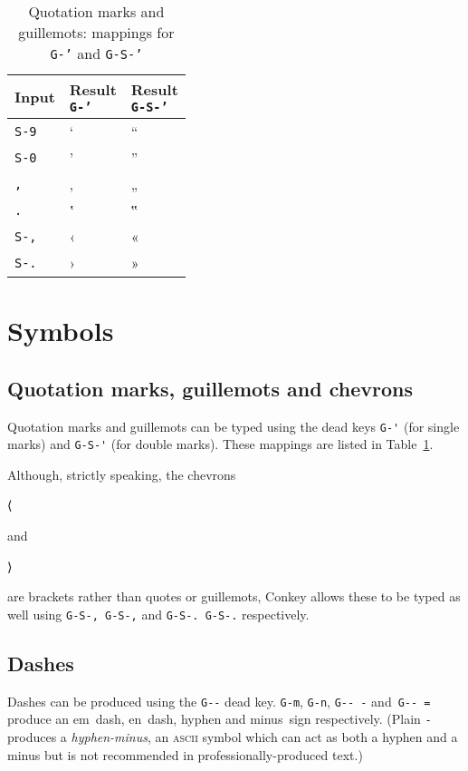 \documentclass[oneside]{memoir}
\newcommand{\key}{\verb}
\newcommand{\keynv}{\texttt}
\newcommand{\out}[1]{\colorbox{gray!20}{\strut{}#1}}
\begin{document}
\begin{table}[t]
\caption{Quotation marks and guillemots: mappings for \keynv{G-'} and \keynv{G-S-'}}
\label{tab:quotes_guillemots}
\centering
\begin{tabular}{lll}
\toprule
Input & \makecell{Result\\\keynv{G-'}} & \makecell{Result\\\keynv{G-S-'}} \\
\midrule
\key|S-9| & ‘ & “ \\
\key|S-0| & ’ & ” \\
\key|,|   & ‚ & „ \\
\key|.|   & ‛ & ‟ \\
\key|S-,| & ‹ & « \\
\key|S-.| & › & » \\
\bottomrule
\end{tabular}
\end{table}

\section{Symbols}
\label{sec:symbols}

\subsection{Quotation marks, guillemots and chevrons}
\label{sec:quotation_marks_guillemots_chevrons}

Quotation marks and guillemots can be typed using the dead keys
  \key|G-'| (for single marks) and \key|G-S-'| (for double marks).
These mappings are listed in Table~\ref{tab:quotes_guillemots}.

Although, strictly speaking, the chevrons \out{⟨} and \out{⟩} are brackets rather than quotes or guillemots,
  Conkey allows these to be typed as well using \key|G-S-, G-S-,| and \key|G-S-. G-S-.| respectively.

\subsection{Dashes}
\label{sec:dashes}

Dashes can be produced using the \key|G--| dead key.
\key|G-m|, \key|G-n|, \key|G-- -| and~\key|G-- =|
  produce an em~dash, en~dash, hyphen and minus~sign respectively.
(Plain \key|-| produces a \textit{hyphen-minus},
  an \textsc{ascii} symbol which can act as both a hyphen and a minus
  but is not recommended in professionally-produced text.)
\end{document}
